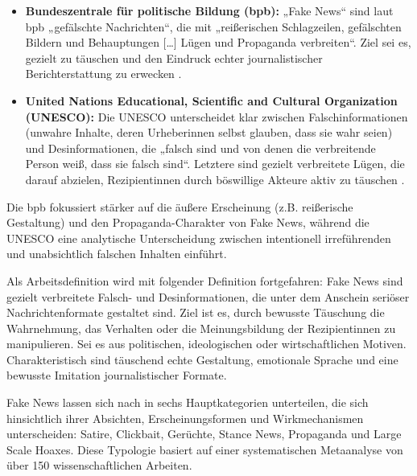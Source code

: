 \begin{itemize}
    \item \textbf{Bundeszentrale für politische Bildung (bpb):}
    „Fake News“ sind laut bpb „gefälschte Nachrichten“, die mit „reißerischen Schlagzeilen, gefälschten Bildern und Behauptungen […] Lügen und Propaganda verbreiten“. 
    Ziel sei es, gezielt zu täuschen und den Eindruck echter journalistischer Berichterstattung zu erwecken \cite{bpb2022fakenews}.

    \item \textbf{United Nations Educational, Scientific and Cultural Organization (UNESCO):}
    Die UNESCO unterscheidet klar zwischen Falschinformationen (unwahre Inhalte, deren Urheberinnen selbst glauben, dass sie wahr seien) und Desinformationen, 
    die „falsch sind und von denen die verbreitende Person weiß, dass sie falsch sind“. Letztere sind gezielt verbreitete Lügen, die darauf abzielen, 
    Rezipientinnen durch böswillige Akteure aktiv zu täuschen \cite{unesco2022fakenews}.
\end{itemize}

Die bpb fokussiert stärker auf die äußere Erscheinung (z.B. reißerische Gestaltung) und den Propaganda-Charakter von Fake News, 
während die UNESCO eine analytische Unterscheidung zwischen intentionell irreführenden und unabsichtlich falschen Inhalten einführt.

Als Arbeitsdefinition wird mit folgender Definition fortgefahren:
Fake News sind gezielt verbreitete Falsch- und Desinformationen, die unter dem Anschein seriöser Nachrichtenformate gestaltet sind. 
Ziel ist es, durch bewusste Täuschung die Wahrnehmung, das Verhalten oder die Meinungsbildung der Rezipientinnen zu manipulieren. Sei es aus politischen, 
ideologischen oder wirtschaftlichen Motiven. Charakteristisch sind täuschend echte Gestaltung, emotionale Sprache und eine bewusste Imitation journalistischer Formate.

Fake News lassen sich nach \cite{Sharma:2024} in sechs Hauptkategorien unterteilen, die sich hinsichtlich ihrer Absichten, Erscheinungsformen und Wirkmechanismen unterscheiden: 
Satire, Clickbait, Gerüchte, Stance News, Propaganda und Large Scale Hoaxes.
Diese Typologie basiert auf einer systematischen Metaanalyse von über 150 wissenschaftlichen Arbeiten.

